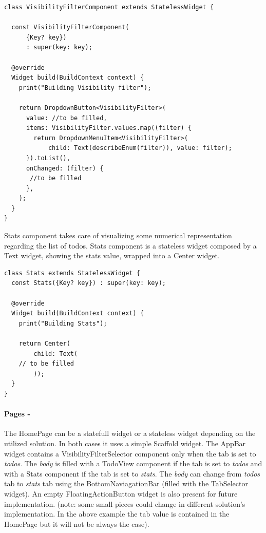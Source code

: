 	\mbox{}
	\begin{code}
 \mbox{}
		\label{code:2.10}
\begin{verbatim}
class VisibilityFilterComponent extends StatelessWidget {

  const VisibilityFilterComponent(
      {Key? key})
      : super(key: key);

  @override
  Widget build(BuildContext context) {
    print("Building Visibility filter");
    
    return DropdownButton<VisibilityFilter>(
      value: //to be filled,
      items: VisibilityFilter.values.map((filter) {
        return DropdownMenuItem<VisibilityFilter>(
            child: Text(describeEnum(filter)), value: filter);
      }).toList(),
      onChanged: (filter) {
       //to be filled
      },
    );
  }
}

	\end{verbatim}
	\end{code}

Stats component takes care of visualizing some numerical representation regarding the list of todos. Stats component is a stateless widget composed by a Text widget, showing the stats value, wrapped into a Center widget.
	
	\mbox{}
	\begin{code}
	 \mbox{}
		\label{code:2.11}
	\begin{verbatim}
class Stats extends StatelessWidget {
  const Stats({Key? key}) : super(key: key);

  @override
  Widget build(BuildContext context) {
    print("Building Stats");

    return Center(
        child: Text(
	// to be filled        
        ));
  }
}
	\end{verbatim}
	\end{code}
	\paragraph{Pages - } 
	\label{par:todo_app_pages}
The HomePage can be a statefull widget or a stateless  widget depending on the utilized solution. In both cases it uses a simple Scaffold widget. The AppBar widget contains a VisibilityFilterSelector component only when the tab is set to \textit{todos}. The \textit{body} is filled with a TodoView component if the tab is set to \textit{todos} and with a Stats component if the tab is set to \textit{stats}. The \textit{body} can change from \textit{todos} tab to \textit{stats} tab using the BottomNaviagationBar (filled with the TabSelector widget). An empty FloatingActionButton widget is also present for future implementation.
	(note: some small pieces could change in different solution’s implementation. In the above example the tab value is contained in the HomePage but it will not be always the case).

